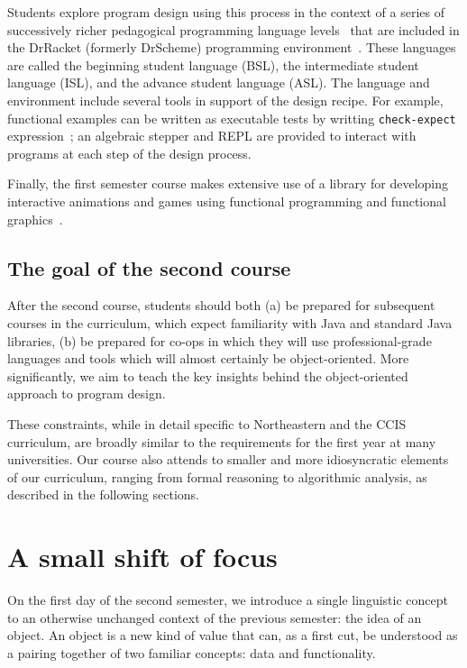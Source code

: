 \documentclass[submission,copyright]{eptcs}
\begin{document}
Students explore program design using this process in the context of a
series of successively richer pedagogical programming language
levels~\cite{dvanhorn:Felleisen2004Structure,
  dvanhorn:Felleisen2001How} that are included in the DrRacket
(formerly DrScheme) programming
environment~\cite{dvanhorn:Findler2002DrScheme}.
%
These languages are called the beginning student language (BSL), the
intermediate student language (ISL), and the advance student language
(ASL).
%
The language and environment include several tools in support of the
design recipe.  For example, functional examples can be written as
executable tests by writting \texttt{check-expect}
expression~\cite{local:check-expect}; an algebraic stepper and REPL
are provided to interact with programs at each step of the design
process.

Finally, the first semester course makes extensive use of a library
for developing interactive animations and games using functional
programming and functional
graphics~\cite{dvanhorn:Felleisen2009Functional, local:barland-sfp10}.

\subsection{The goal of the second course}

After the second course, students should both (a) be prepared for
subsequent courses in the curriculum, which expect familiarity with
Java and standard Java libraries, (b) be prepared for co-ops in which
they will use professional-grade languages and tools which will almost
certainly be object-oriented.  More significantly, we aim to teach the
key insights behind the object-oriented approach to program design.

These constraints, while in detail specific to Northeastern and the
CCIS curriculum, are broadly similar to the requirements for the first
year at many universities.  Our course also attends to smaller and
more idiosyncratic elements of our curriculum, ranging from formal
reasoning to algorithmic analysis, as described in the following
sections.



\section{A small shift of focus}
\label{sec:shift}

On the first day of the second semester, we introduce a single
linguistic concept to an otherwise unchanged context of the previous
semester: the idea of an object.
%
An object is a new kind of value that can, as a first cut, be
understood as a pairing together of two familiar concepts: data and
functionality.
\end{document}
